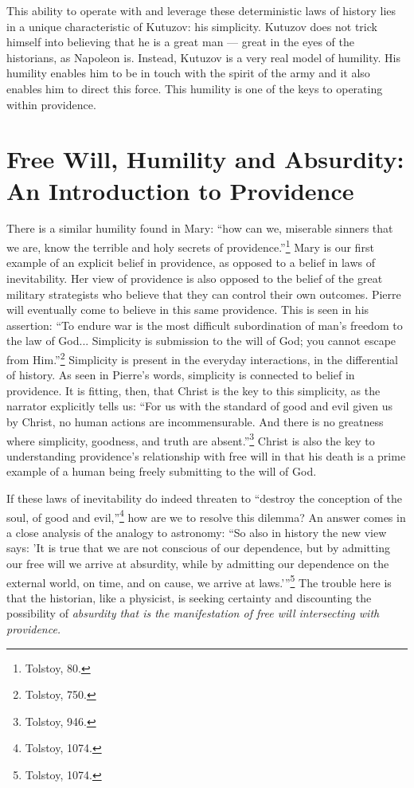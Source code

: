 \documentclass[12pt]{article}
\begin{document}
This ability to operate with and leverage these deterministic laws of history lies in a unique characteristic of Kutuzov: his simplicity. Kutuzov does not trick himself into believing that he is a great man — great in the eyes of the historians, as Napoleon is. Instead, Kutuzov is a very real model of humility. His humility enables him to be in touch with the spirit of the army and it also enables him to direct this force. This humility is one of the keys to operating within providence.

\section{Free Will, Humility and Absurdity: An Introduction to Providence}
There is a similar humility found in Mary: ``how can we, miserable sinners that we are, know the terrible and holy secrets of providence.''\footnote{Tolstoy, 80.} Mary is our first example of an explicit belief in providence, as opposed to a belief in laws of inevitability. Her view of providence is also opposed to the belief of the great military strategists who believe that they can control their own outcomes. Pierre will eventually come to believe in this same providence. This is seen in his assertion: ``To endure war is the most difficult subordination of man's freedom to the law of God... Simplicity is submission to the will of God; you cannot escape from Him.''\footnote{Tolstoy, 750.} Simplicity is present in the everyday interactions, in the differential of history. As seen in Pierre’s words, simplicity is connected to belief in providence. It is fitting, then, that Christ is the key to this simplicity, as the narrator explicitly tells us: ``For us with the standard of good and evil given us by Christ, no human actions are incommensurable. And there is no greatness where simplicity, goodness, and truth are absent.''\footnote{Tolstoy, 946.} Christ is also the key to understanding providence's relationship with free will in that his death is a prime example of a human being freely submitting to the will of God.

If these laws of inevitability do indeed threaten to ``destroy the conception of the soul, of good and evil,''\footnote{Tolstoy, 1074.} how are we to resolve this dilemma? An answer comes in a close analysis of the analogy to astronomy: ``So also in history the new view says: 'It is true that we are not conscious of our dependence, but by admitting our free will we arrive at absurdity, while by admitting our dependence on the external world, on time, and on cause, we arrive at laws.'\thinspace''\footnote{Tolstoy, 1074.} The trouble here is that the historian, like a physicist, is seeking certainty and discounting the possibility of \emph{absurdity that is the manifestation of free will intersecting with providence.} 
\end{document}
